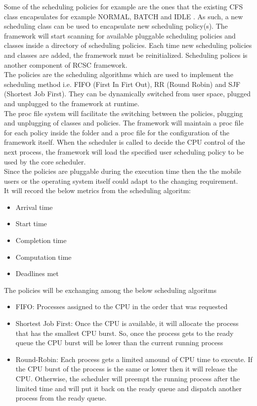 \documentclass[conference]{IEEEtran}
\begin{document}
Some of the scheduling policies for example are the ones that the existing CFS class encapsulates for example NORMAL, BATCH and IDLE \cite{SchLnx}. 
As such, a new scheduling class can be used to encapsulate new scheduling policy(s). The framework will start scanning for available pluggable scheduling policies  and classes inside a directory of scheduling policies. Each time new scheduling policies and classes are added, the framework must be reinitialized. Scheduling polices is another component of RCSC framework. \\
The policies are the scheduling algorithms which are used to implement the scheduling method i.e. FIFO (First In Firt Out), RR (Round Robin) and SJF (Shortest Job First). They can be dynamically switched from user space, plugged and unplugged to the framework at runtime.  \cite{ALMA01} \\
The proc file system will facilitate the switching between the policies, plugging and unplugging of classes and policies. The framework will maintain a proc file for each policy inside the folder and a proc file for the configuration of the framework itself. When the scheduler is called to decide the CPU control of the next process, the framework will load the specified user scheduling policy to be used by the core scheduler.\\
Since the policies are pluggable during the execution time then the the mobile users or the operating system itself could adapt to the changing requirement.\\

It will record the below metrics from the scheduling algoritm:
\begin{itemize}
\item Arrival time
\item Start time
\item Completion time
\item Computation time
\item Deadlines met
\end{itemize}

The policies will be exchanging among the below scheduling algoritms
\begin{itemize}
\item FIFO: Processes assigned to the CPU in the order that was requested
\item Shortest Job First: Once the CPU is available, it will allocate the process that has the smallest CPU burst. So, once the process gets to the ready queue the CPU burst will be lower than the current running process 
\item Round-Robin: Each process gets a limited amound of CPU time to execute. If the CPU burst of the process is the same or lower then it will release the CPU. Otherwise, the scheduler will preempt the running process after the limited time and will put it back on the ready queue and dispatch another process from the ready queue.
\end{itemize}
\end{document}
